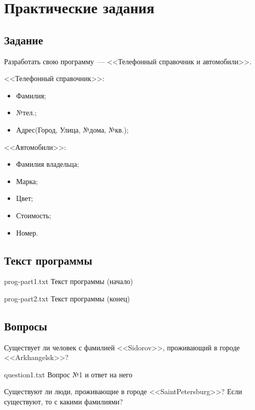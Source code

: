 \chapter{Практические задания}

\section{Задание}

Разработать свою программу~--- <<Телефонный справочник и автомобили>>. 

<<Телефонный справочник>>:
\begin{itemize}[label*=--]
	\item Фамилия;
	\item №тел.;
	\item Адрес(Город, Улица, №дома, №кв.);
\end{itemize}

<<Автомобили>>:
\begin{itemize}[label*=--]
	\item Фамилия владельца;
	\item Марка;
	\item Цвет;
	\item Стоимость;
	\item Номер.
\end{itemize}

\section{Текст программы}

{prog-part1.txt} %
{Текст программы (начало)} %

{prog-part2.txt} %
{Текст программы (конец)} %
	
\section{Вопросы}

Существует ли человек с фамилией <<Sidorov>>, проживающий в городе <<Arkhangelsk>>?
	
{question1.txt} %
{Вопрос №1 и ответ на него} %

Существуют ли люди, проживающие в городе <<SaintPetersburg>>? Если существуют, то с какими фамилиями?


